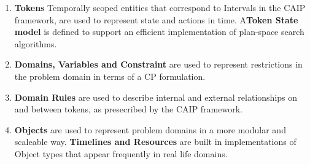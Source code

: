 \begin{enumerate}

\item \textbf{Tokens} Temporally scoped entities that correspond to
  Intervals in the CAIP framework, are used to represent state and
  actions in time. A\textbf{Token State model} is defined to support
  an efficient implementation of plan-space search algorithms.

\item \textbf{Domains, Variables and Constraint} are used to represent
  restrictions in the problem domain in terms of a CP formulation.

\item \textbf{Domain Rules} are used to describe internal and external
  relationships on and between tokens, as presecribed by the CAIP
  framework.
  
\item \textbf{Objects} are used to represent problem domains in a more
  modular and scaleable way. \textbf{Timelines and Resources} are
  built in implementations of Object types that appear frequently in
  real life domains.

\end{enumerate}

